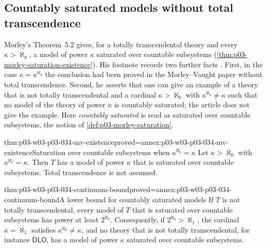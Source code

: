\subsection{Countably saturated models without total transcendence}
\label{sec:p03-w03-p03-034-countable-saturation}

Morley's Theorem~5.2 gives, for a totally transcendental theory and every
\(\kappa>\aleph_0\), a model of power \(\kappa\) saturated over countable
subsystems (\cref{thm:p03-morley-saturation-existence}). His footnote
records two further facts \cite[p.~535, n.~24]{Morley1965}. First, in the
case \(\kappa=\kappa^{\aleph_0}\) the conclusion had been proved in the
Morley--Vaught paper without total transcendence. Second, he asserts that
one can give an example of a theory that is not totally transcendental and a
cardinal \(\kappa>\aleph_0\) with \(\kappa^{\aleph_0}\neq\kappa\) such
that no model of the theory of power \(\kappa\) is countably saturated; the
article does not give the example. Here \emph{countably saturated} is read
as saturated over countable subsystems, the notion of
\cref{def:p03-morley-saturation}.

\begin{hbtheorem}{thm:p03-w03-p03-034-mv-existence}{proved=annex:p03-w03-p03-034-mv-existence}{Saturation over countable subsystems when \(\kappa^{\aleph_0}=\kappa\)}
Let \(\kappa>\aleph_0\) with \(\kappa^{\aleph_0}=\kappa\). Then \(T\) has
a model of power \(\kappa\) that is saturated over countable subsystems.
Total transcendence is not assumed.
\end{hbtheorem}

\begin{hbtheorem}{thm:p03-w03-p03-034-continuum-bound}{proved=annex:p03-w03-p03-034-continuum-bound}{A lower bound for countably saturated models}
If \(T\) is not totally transcendental, every model of \(T\) that is
saturated over countable subsystems has power at least \(2^{\aleph_0}\).
Consequently, if \(2^{\aleph_0}>\aleph_1\), the cardinal
\(\kappa=\aleph_1\) satisfies \(\kappa^{\aleph_0}\neq\kappa\), and no
theory that is not totally transcendental, for instance \(\mathsf{DLO}\),
has a model of power \(\kappa\) saturated over countable subsystems.
\end{hbtheorem}

